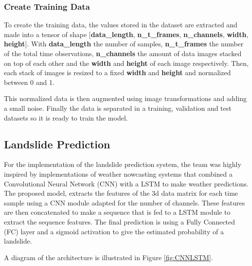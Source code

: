 \documentclass[sigconf, nonacm]{acmart}
\begin{document}

\subsubsection{Create Training Data} 

\noindent

To create the training data, the values stored in the dataset are extracted and made into a tensor of shape [\textbf{data\_length}, \textbf{n\_t\_frames}, \textbf{n\_channels}, \textbf{width}, \textbf{height}]. With \textbf{data\_length} the number of samples, \textbf{n\_t\_frames} the number of the total time observations, \textbf{n\_channels} the amount of data images stacked on top of each other and the \textbf{width} and \textbf{height} of each image respectively. Then, each stack of images is resized to a fixed \textbf{width} and \textbf{height} and normalized between 0 and 1.

This normalized data is then augmented using image transformations and adding a small noise. Finally the data is separated in a training, validation and test datasets so it is ready to train the model.



\subsection{Landslide Prediction}

For the implementation of the landslide prediction system, the team was highly inspired by implementations of weather nowcasting systems \cite{Forecast_LSTM} that combined a Convolutional Neural Network (CNN) with a LSTM \cite{LSTM} to make weather predictions. %
The proposed model, extracts the features of the 3d data matrix for each time sample using a CNN module adapted for the number of channels. These features are then concatenated to make a sequence that is fed to a LSTM module to extract the sequence features. The final prediction is using a Fully Connected (FC) layer and a sigmoid activation to give the estimated probability of a landslide. 

A diagram of the architecture is illustrated in Figure \ref{fig:CNNLSTM}.%
\end{document}
